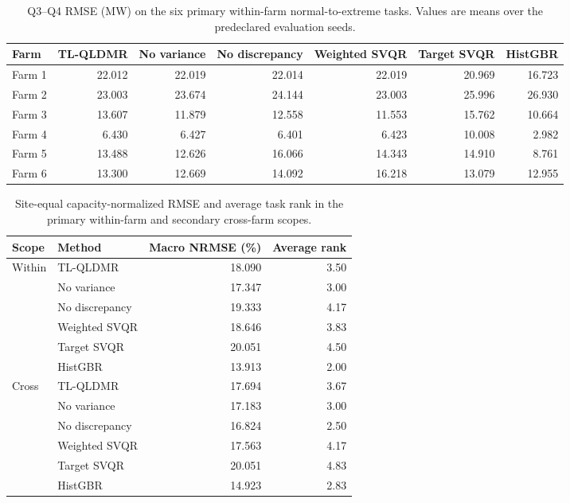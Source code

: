 \begin{table}[pos=t,width=\FullWidth]
\centering
\color{blue}
\caption{Q3--Q4 RMSE (MW) on the six primary within-farm normal-to-extreme tasks. Values are means over the predeclared evaluation seeds.}
\label{tab:selection-v2-primary-within}
\small
\setlength{\tabcolsep}{4pt}
\begin{tabular}{lrrrrrr}
\toprule
Farm & TL-QLDMR & No variance & No discrepancy & Weighted SVQR & Target SVQR & HistGBR \\
\midrule
Farm 1 & 22.012 & 22.019 & 22.014 & 22.019 & 20.969 & 16.723 \\
Farm 2 & 23.003 & 23.674 & 24.144 & 23.003 & 25.996 & 26.930 \\
Farm 3 & 13.607 & 11.879 & 12.558 & 11.553 & 15.762 & 10.664 \\
Farm 4 & 6.430 & 6.427 & 6.401 & 6.423 & 10.008 & 2.982 \\
Farm 5 & 13.488 & 12.626 & 16.066 & 14.343 & 14.910 & 8.761 \\
Farm 6 & 13.300 & 12.669 & 14.092 & 16.218 & 13.079 & 12.955 \\
\bottomrule
\end{tabular}
\end{table}

\begin{table}[pos=t]
\centering
\color{blue}
\caption{Site-equal capacity-normalized RMSE and average task rank in the primary within-farm and secondary cross-farm scopes.}
\label{tab:selection-v2-scope}
\small
\setlength{\tabcolsep}{4pt}
\begin{tabular}{llrr}
\toprule
Scope & Method & Macro NRMSE (\%) & Average rank \\
\midrule
Within & TL-QLDMR & 18.090 & 3.50 \\
 & No variance & 17.347 & 3.00 \\
 & No discrepancy & 19.333 & 4.17 \\
 & Weighted SVQR & 18.646 & 3.83 \\
 & Target SVQR & 20.051 & 4.50 \\
 & HistGBR & 13.913 & 2.00 \\
\midrule
Cross & TL-QLDMR & 17.694 & 3.67 \\
 & No variance & 17.183 & 3.00 \\
 & No discrepancy & 16.824 & 2.50 \\
 & Weighted SVQR & 17.563 & 4.17 \\
 & Target SVQR & 20.051 & 4.83 \\
 & HistGBR & 14.923 & 2.83 \\
\bottomrule
\end{tabular}
\end{table}

